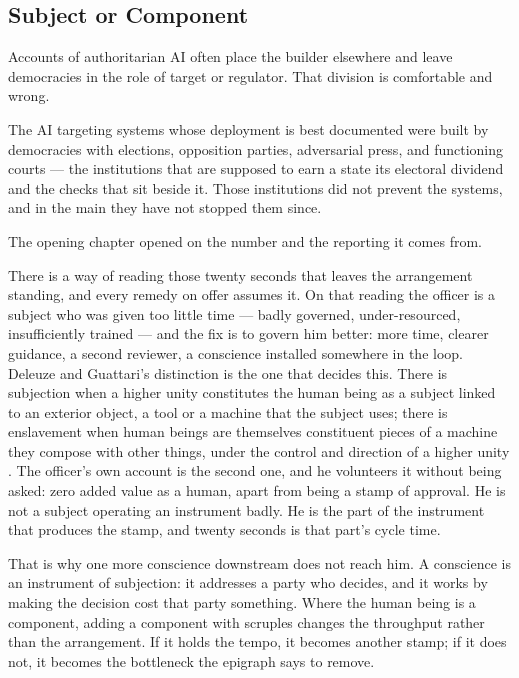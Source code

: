 \subsection{Subject or Component}
\label{sec:subject-component}
Accounts of authoritarian AI often place the builder elsewhere and leave democracies in the role of target or regulator. That division is comfortable and wrong.

The AI targeting systems whose deployment is best documented were built by democracies with elections, opposition parties, adversarial press, and functioning courts — the institutions that are supposed to earn a state its electoral dividend and the checks that sit beside it. Those institutions did not prevent the systems, and in the main they have not stopped them since.

The opening chapter opened on the number and the reporting it comes
from.

There is a way of reading those twenty seconds that leaves the arrangement standing, and every remedy on offer assumes it. On that reading the officer is a subject who was given too little time — badly governed, under-resourced, insufficiently trained — and the fix is to govern him better: more time, clearer guidance, a second reviewer, a conscience installed somewhere in the loop. Deleuze and Guattari's distinction is the one that decides this. There is subjection when a higher unity constitutes the human being as a subject linked to an exterior object, a tool or a machine that the subject uses; there is enslavement when human beings are themselves constituent pieces of a machine they compose with other things, under the control and direction of a higher unity \autocite[Plateau~13]{deleuze1987plateaus}. The officer's own account is the second one, and he volunteers it without being asked: zero added value as a human, apart from being a stamp of approval. He is not a subject operating an instrument badly. He is the part of the instrument that produces the stamp, and twenty seconds is that part's cycle time.

That is why one more conscience downstream does not reach him. A
conscience is an instrument of subjection: it addresses a party who
decides, and it works by making the decision cost that party something.
Where the human being is a component, adding a component with scruples
changes the throughput rather than the arrangement. If it holds the
tempo, it becomes another stamp; if it does not, it becomes the
bottleneck the epigraph says to remove.

